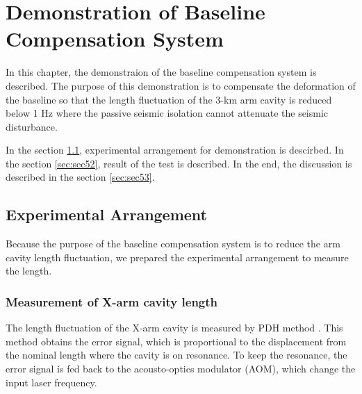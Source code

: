 \chapter{Demonstration of Baseline Compensation System} \label{chap5}
In this chapter, the demonstraion of the baseline compensation system is described. The purpose of this demonstration is to compensate the deformation of the baseline so that the length fluctuation of the 3-km arm cavity is reduced below 1 Hz where the passive seismic isolation cannot attenuate the seismic disturbance. 

In the section \cref{sec:sec51}, experimental arrangement for demonstration is descirbed. In the section \cref{sec:sec52}, result of the test is described. In the end, the discussion is described in the section \cref{sec:sec53}.

\section{Experimental Arrangement} \label{sec:sec51}
Because the purpose of the baseline compensation system is to reduce the arm cavity length fluctuation, we prepared the experimental arrangement to measure the length.

\subsection{Measurement of X-arm cavity length}
The length fluctuation of the X-arm cavity is measured by PDH method \cite{drever1983laser}. This method obtains the error signal, which is proportional to the displacement from the nominal length where the cavity is on resonance. To keep the resonance, the error signal is fed back to the acousto-optics modulator (AOM), which change the input laser frequency.

